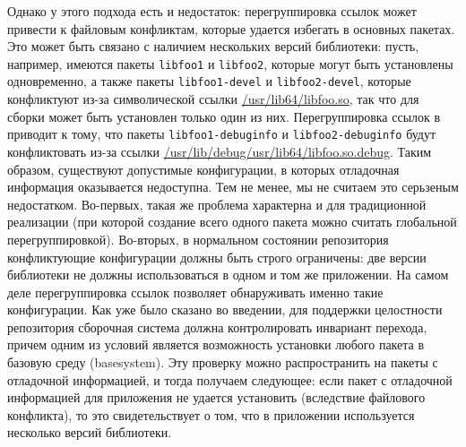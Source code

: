\documentclass[russian,a4paper,12pt,titlepage]{article}
\begin{document}
Однако у этого подхода есть и недостаток: перегруппировка ссылок может привести к файловым конфликтам,
которые удается избегать в основных пакетах.  Это может быть связано с наличием нескольких версий библиотеки:
пусть, например, имеются пакеты \verb|libfoo1| и \verb|libfoo2|, которые могут быть установлены одновременно,
а также пакеты \verb|libfoo1-devel| и \verb|libfoo2-devel|, которые конфликтуют из-за символической ссылки
\url{/usr/lib64/libfoo.so}, так что для сборки может быть установлен только один из них.  Перегруппировка
ссылок в приводит к тому, что пакеты \verb|libfoo1-debuginfo| и \verb|libfoo2-debuginfo| будут конфликтовать
из-за ссылки \url{/usr/lib/debug/usr/lib64/libfoo.so.debug}.  Таким образом, существуют допустимые конфигурации,
в которых отладочная информация оказывается недоступна.  Тем не менее, мы не считаем это серьзеным недостатком.
Во-первых, такая же проблема характерна и для традиционной реализации (при которой создание всего одного пакета
можно считать глобальной перегруппировкой).  Во-вторых, в нормальном состоянии репозитория конфликтующие конфигурации
должны быть строго ограничены: две версии библиотеки не должны использоваться в одном и том же приложении.
На самом деле перегруппировка ссылок позволяет обнаруживать именно такие конфигурации.  Как уже было сказано во введении,
для поддержки целостности репозитория сборочная система должна контролировать инвариант перехода, причем одним
из условий является возможность установки любого пакета в базовую среду (basesystem).  Эту проверку можно распространить
на пакеты с отладочной информацией, и тогда получаем следующее: если пакет с отладочной информацией для приложения не удается
установить (вследствие файлового конфликта), то это свидетельствует о том, что в приложении используется несколько
версий библиотеки.
\end{document}
